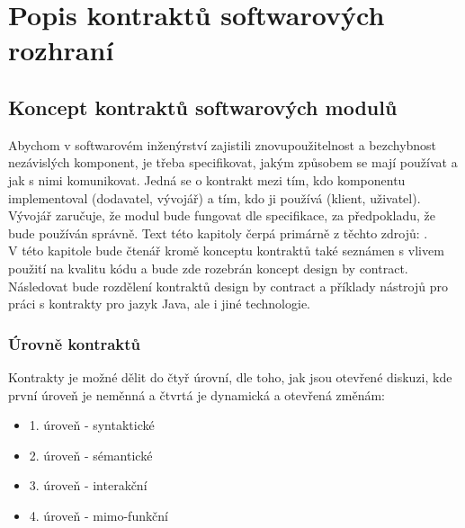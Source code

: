 \chapter{Popis kontraktů softwarových rozhraní}

	\section{Koncept kontraktů softwarových modulů}	
		Abychom v softwarovém inženýrství zajistili znovupoužitelnost a bezchybnost nezávislých komponent, je třeba specifikovat, jakým způsobem se mají používat a jak s nimi komunikovat. Jedná se o kontrakt mezi tím, kdo komponentu implementoval (dodavatel, vývojář) a tím, kdo ji používá (klient, uživatel). Vývojář zaručuje, že modul bude fungovat dle specifikace, za předpokladu, že bude používán správně. Text této kapitoly čerpá primárně z těchto zdrojů: \cite{contractsInWild}\cite{applyingDbc}\cite{ooswConstruction}\cite{contractAware}.\\		
		
		V této kapitole bude čtenář kromě konceptu kontraktů také seznámen s vlivem použití na kvalitu kódu a bude zde rozebrán koncept design by contract. Následovat bude rozdělení kontraktů design by contract a příklady nástrojů pro práci s kontrakty pro jazyk Java, ale i jiné technologie.\\
		
		\subsection{Úrovně kontraktů}		
			Kontrakty je možné dělit do čtyř úrovní, dle toho, jak jsou otevřené diskuzi, kde první úroveň je neměnná a čtvrtá je dynamická a otevřená změnám: 
			\begin{itemize}
				\item 1. úroveň - syntaktické
				\item 2. úroveň - sémantické
				\item 3. úroveň - interakční
				\item 4. úroveň - mimo-funkční
			\end{itemize}
		
